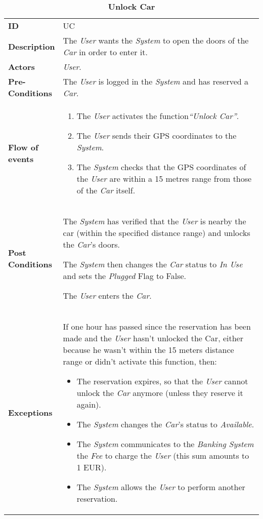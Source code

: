 \begin{longtable}{|p{0.2\linewidth} p{0.8\linewidth}|}
	\captionsetup{labelformat=empty} %
	\caption{\textbf{Unlock Car}} %
	\label{UC_UnlockCar}%
	\\ \hline %
	
	\textbf{ID} & UC\theUseCaseIdCounter \\ \hline
	\textbf{Description} & The \emph{User} wants the \emph{System} to open the doors of the \emph{Car} in order to enter it. \\ \hline
	\textbf{Actors} & \emph{User}.\\ \hline
	\textbf{Pre-Conditions} & The \emph{User} is logged in the \emph{System} and has reserved a \emph{Car}. \\ \hline
	\textbf{Flow of events} & 
	\begin{enumerate}
		\item The \emph{User} activates the function\textit{\textquotedblleft{Unlock Car}\textquotedblright}.
		\item The \emph{User} sends their GPS coordinates to the \emph{System}.
		\item The \emph{System} checks that the GPS coordinates of the \emph{User} are within a 15 metres range from those of the \emph{Car} itself.
	\end{enumerate}	 \\ \hline
	\textbf{Post Conditions} & The \emph{System} has verified that the \emph{User} is nearby the car (within the specified distance range) and unlocks the \emph{Car}'s doors.
	 
The \emph{System} then changes the \emph{Car} status to \emph{In Use} and sets the \emph{Plugged} Flag to False.

The \emph{User} enters the \emph{Car}. \\ \hline
	\textbf{Exceptions} & If one hour has passed since the reservation has been made and the \emph{User} hasn't unlocked the Car, either because he wasn't within the 15 meters distance range or didn't activate this function, then:
	\begin{itemize}
	\item The reservation expires, so that the \emph{User} cannot unlock the \emph{Car} anymore (unless they reserve it again).
	\item The \emph{System} changes the \emph{Car}'s status to \emph{Available}.
	\item The \emph{System} communicates to the \emph{Banking System} the \emph{Fee} to charge the \emph{User} (this sum amounts to 1 EUR).
	\item The \emph{System} allows the \emph{User} to perform another reservation.
	\end{itemize} \\ \hline
\end{longtable}


